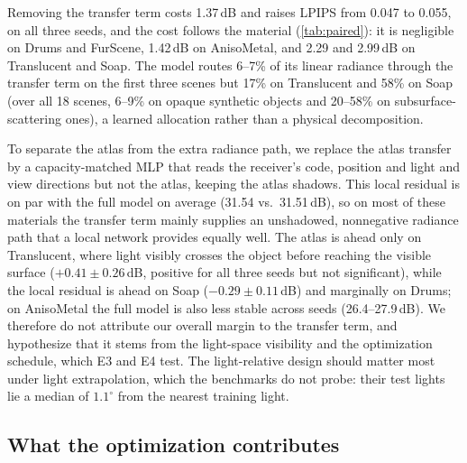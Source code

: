 


Removing the transfer term costs 1.37\,dB and raises LPIPS from 0.047 to 0.055, on all three seeds, and the cost follows the material (\cref{tab:paired}): it is negligible on Drums and FurScene, 1.42\,dB on AnisoMetal, and 2.29 and 2.99\,dB on Translucent and Soap.
The model routes 6--7\% of its linear radiance through the transfer term on the first three scenes but 17\% on Translucent and 58\% on Soap (over all 18 scenes, 6--9\% on opaque synthetic objects and 20--58\% on subsurface-scattering ones), a learned allocation rather than a physical decomposition.

To separate the atlas from the extra radiance path, we replace the atlas transfer by a capacity-matched MLP that reads the receiver's code, position and light and view directions but not the atlas, keeping the atlas shadows.
This local residual is on par with the full model on average (31.54 vs.\ 31.51\,dB), so on most of these materials the transfer term mainly supplies an unshadowed, nonnegative radiance path that a local network provides equally well.
The atlas is ahead only on Translucent, where light visibly crosses the object before reaching the visible surface ($+0.41\pm0.26$\,dB, positive for all three seeds but not significant), while the local residual is ahead on Soap ($-0.29\pm0.11$\,dB) and marginally on Drums; on AnisoMetal the full model is also less stable across seeds (26.4--27.9\,dB).
We therefore do not attribute our overall margin to the transfer term, and hypothesize that it stems from the light-space visibility and the optimization schedule, which E3 and E4 test.
The light-relative design should matter most under light extrapolation, which the benchmarks do not probe: their test lights lie a median of $1.1^\circ$ from the nearest training light.




\subsection{What the optimization contributes}
\label{sec:exp_optimization}
